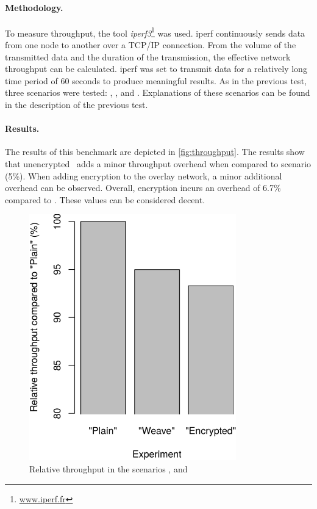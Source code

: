 \paragraph{Methodology.} To measure throughput, the tool \emph{iperf3}\footnote{\url{www.iperf.fr}} was used. iperf continuously sends data from one node to another over a TCP/IP connection. From the volume of the transmitted data and the duration of the transmission, the effective network throughput can be calculated. iperf was set to transmit data for a relatively long time period of 60 seconds to produce meaningful results. As in the previous test, three scenarios were tested:  , , and . Explanations of these scenarios can be found in the description of the previous test.

\paragraph{Results.} The results of this benchmark are depicted in \autoref{fig:throughput}. The results show that unencrypted \wnet\ adds a minor throughput overhead when compared to  scenario (5\%). When adding encryption to the overlay network, a minor additional overhead can be observed. Overall, encryption incurs an overhead of 6.7\% compared to . These values can be considered decent. 


\begin{figure}[htpb]
  \centering
  \includegraphics[width=0.8\textwidth]{figures/throughput}
  \caption[Weave throughput benchmark results]{Relative throughput in the scenarios ,  and }\label{fig:throughput}
\end{figure}

